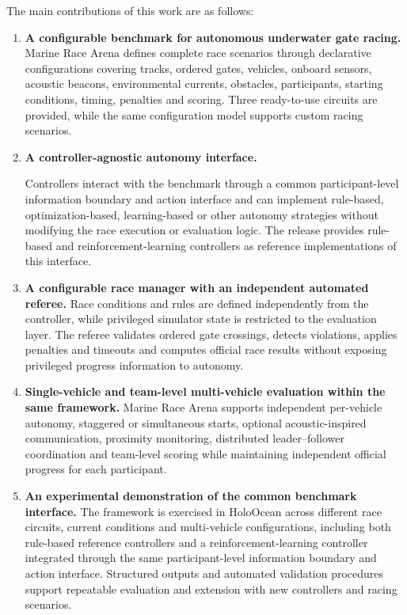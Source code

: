 The main contributions of this work are as follows:

\begin{enumerate}

\item \textbf{A configurable benchmark for autonomous underwater gate racing.}
Marine Race Arena defines complete race scenarios through declarative
configurations covering tracks, ordered gates, vehicles, onboard sensors,
acoustic beacons, environmental currents, obstacles, participants, starting
conditions, timing, penalties and scoring. Three ready-to-use circuits are
provided, while the same configuration model supports custom racing scenarios.

\item \textbf{A controller-agnostic autonomy interface.}\par
Controllers interact with the benchmark through a common participant-level
information boundary and action interface and can implement rule-based,
optimization-based, learning-based or other autonomy strategies without
modifying the race execution or evaluation logic. The release provides
rule-based and reinforcement-learning controllers as reference implementations
of this interface.

\item \textbf{A configurable race manager with an independent automated referee.}
Race conditions and rules are defined independently from the controller, while
privileged simulator state is restricted to the evaluation layer. The referee
validates ordered gate crossings, detects violations, applies penalties and
timeouts and computes official race results without exposing privileged progress
information to autonomy.

\item \textbf{Single-vehicle and team-level multi-vehicle evaluation within the
same framework.}
Marine Race Arena supports independent per-vehicle autonomy, staggered or
simultaneous starts, optional acoustic-inspired communication, proximity
monitoring, distributed leader--follower coordination and team-level scoring
while maintaining independent official progress for each participant.

\item \textbf{An experimental demonstration of the common benchmark interface.}
The framework is exercised in HoloOcean across different race circuits, current
conditions and multi-vehicle configurations, including both rule-based
reference controllers and a reinforcement-learning controller integrated through
the same participant-level information boundary and action interface. Structured
outputs and automated
validation procedures support repeatable evaluation and extension with new
controllers and racing scenarios.

\end{enumerate}


